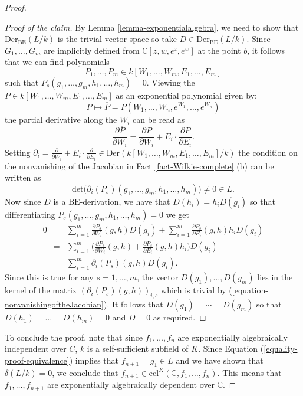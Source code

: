\documentclass[12pt]{amsart}
\newcommand{\C}{\mathbb{C}}
\newcommand{\BE}{\mathrm{BE}}
\theoremstyle{definition}
\theoremstyle{plain}
\theoremstyle{exampstyle}\newtheorem{thmx}{Theorem}
\theoremstyle{exampstyle}\newtheorem{thmxbis}{Theorem}
\begin{document}
\begin{proof}
\begin{proof}[Proof of the claim]
By Lemma \ref{lemma-exponentialalgebra}, we need to show that $\mathrm{Der}_{\BE}(L/k)$ is the trivial vector space so take $D \in \mathrm{Der}_{\BE}(L/k)$.  Since $G_1,\ldots,G_m$ are implicitly defined from $\mathbb{C}[z,w,e^z,e^w]$ at the point $b$, it follows that we can find polynomials $$P_1,\ldots,P_m \in k[W_1,\ldots,W_m, E_1,\ldots,E_m]$$ such that $P_s(g_1,\ldots,g_m,h_1,\ldots,h_m) = 0$. Viewing the $P \in k[W_1,\ldots, W_m, E_1,\ldots, E_m]$ as an exponential polynomial given by:
$$ P \mapsto \overline{P} =  P(W_1,\ldots,W_n,e^{W_1},\ldots, e^{W_n})  $$
the partial derivative along the $W_i$ can be read as 
$$ \frac{\partial \overline{P}}{\partial W_i} = \overline{\frac{\partial P} {\partial W_i} + E_i \cdot \frac {\partial P} {\partial E_i}}.$$ 
Setting $\partial_i = \frac{\partial} {\partial W_i} + E_i \cdot \frac {\partial} {\partial E_i} \in \mathrm{Der}(k[W_1,\ldots,W_m,E_1,\ldots,E_m]/k)$ the condition on the nonvanishing of the Jacobian in Fact  \ref{fact-Wilkie-complete} (b) can be written as
\begin{equation}\label{equation-nonvanishingoftheJacobian}
 \mathrm{det}\Big( \partial_i(P_s) (g_1,\ldots,g_m,h_1,\ldots,h_m) \Big) \neq 0 \in L.
 \end{equation}
Now since $D$ is a $\BE$-derivation, we have that $D(h_i) = h_i D(g_i)$ so that differentiating $P_s(g_1,\ldots,g_m,h_1,\ldots,h_m) = 0$ we get 
\begin{eqnarray*}
0  & = &  \sum_{i = 1}^m \frac{\partial P_s}{\partial W_i}(g,h) D(g_i) + \sum_{i = 1}^m \frac{\partial P_s}{\partial E_i}(g,h) h_i D(g_i) \\
& = & \sum_{i = 1}^m \Big( \frac{\partial P_s}{\partial W_i}(g,h) + \frac{\partial P_s}{\partial E_i}(g,h) h_i \Big) D(g_i) \\
& = &  \sum_{i = 1}^m \partial_i(P_s)(g,h) D(g_i).
\end{eqnarray*}
Since this is true for any $s = 1,\ldots, m$, the vector $D(g_1),\ldots, D(g_m)$ lies in the kernel of the matrix $(\partial_i(P_s)(g,h))_{i,s}$ which is trivial by (\ref{equation-nonvanishingoftheJacobian}). It follows that $D(g_1) = \cdots = D(g_m) $ so that $D(h_1) = \ldots = D(h_m) = 0$ and $D = 0$ as required.
\end{proof}
To conclude the proof, note that since $f_1,\ldots,f_n$ are exponentially algebraically independent over $C$, $k$ is a self-sufficient subfield of $K$. Since Equation (\ref{equality-proof-equivalence}) implies that $f_{n+1} = g_1 \in L$ and we have shown that $\delta(L/k) = 0$, we conclude that $f_{n+1} \in \mathrm{ecl}^{K}(\C, f_1,\ldots,f_n)$. This means that $f_1,\ldots, f_{n+1}$ are exponentially algebraically dependent over $\mathbb{C}$.
\end{proof} 
\end{document}
